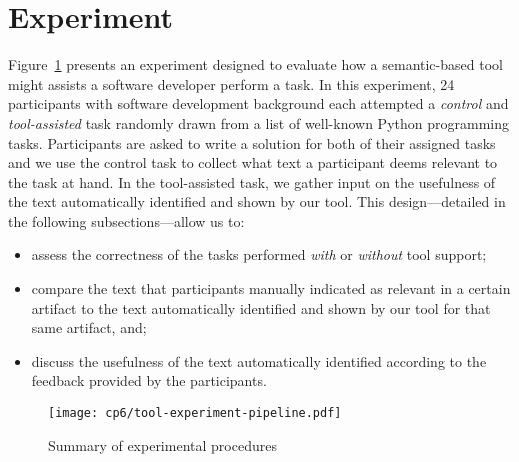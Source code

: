 




\section{Experiment}
\label{cp6:experiment}





Figure~\ref{fig:tool-experiment-procedures} presents an experiment designed to evaluate how a semantic-based tool might assists a software developer perform a task.
In this experiment, 24 participants with software development background each attempted a
\textit{control} and \textit{tool-assisted} task randomly drawn from a list of well-known Python programming tasks.
Participants are asked to write a solution for both of their assigned tasks
and we use the control task to collect what text a participant deems relevant to the task at hand.
In the tool-assisted task, we gather input on the usefulness of the text automatically identified and shown by our tool. 
This design---detailed in the following subsections---allow us to:




\begin{itemize}
    \item assess the correctness of the tasks performed \textit{with} or \textit{without} tool support;
    \item compare  the text that participants manually indicated as relevant in a certain artifact to the text automatically identified
    and shown by our tool for that same artifact, and;
    \item discuss the usefulness of the text automatically identified  according to the feedback provided by the participants.
\end{itemize}
 




\begin{figure}
\centering
\texttt{[image: cp6/tool-experiment-pipeline.pdf]}
\caption{Summary of experimental procedures}
\label{fig:tool-experiment-procedures}
\end{figure}






